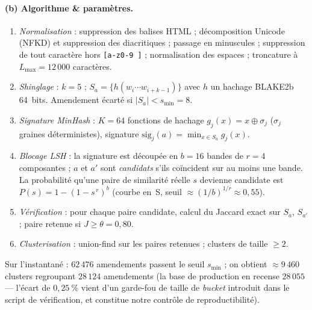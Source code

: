 \documentclass[11pt,a4paper]{article}
\begin{document}
\paragraph{(b) Algorithme \& paramètres.}
\begin{enumerate}[label=\arabic*.]
  \item \emph{Normalisation} : suppression des balises HTML ; décomposition
        Unicode (NFKD) et suppression des diacritiques ; passage en minuscules ;
        suppression de tout caractère hors \texttt{[a-z0-9 ]} ; normalisation des
        espaces ; troncature à $L_{\max}=12\,000$ caractères.
  \item \emph{Shinglage} : $k = 5$ ; $S_a=\{h(w_i\cdots w_{i+k-1})\}$ avec $h$ un
        hachage BLAKE2b 64~bits. Amendement écarté si $|S_a| < s_{\min}=8$.
  \item \emph{Signature MinHash} : $K=64$ fonctions de hachage
        $g_j(x)=x\oplus\sigma_j$ ($\sigma_j$ graines déterministes), signature
        $\mathrm{sig}_j(a)=\min_{x\in S_a} g_j(x)$.
  \item \emph{Blocage LSH} : la signature est découpée en $b=16$ bandes de $r=4$
        composantes ; $a$ et $a'$ sont \emph{candidats} s'ils coïncident sur au
        moins une bande. La probabilité qu'une paire de similarité réelle $s$
        devienne candidate est $P(s)=1-(1-s^{\,r})^{b}$ (courbe en~S, seuil
        $\approx (1/b)^{1/r}\approx 0{,}55$).
  \item \emph{Vérification} : pour chaque paire candidate, calcul du Jaccard exact
        sur $S_a$, $S_{a'}$ ; paire retenue si $J\ge\theta=0{,}80$.
  \item \emph{Clusterisation} : union-find sur les paires retenues ; clusters de
        taille $\ge 2$.
\end{enumerate}
Sur l'instantané : $62\,476$ amendements passent le seuil $s_{\min}$ ; on obtient
$\approx 9\,460$ clusters regroupant $28\,124$ amendements (la base de production en
recense $28\,055$ — l'écart de $0{,}25~\%$ vient d'un garde-fou de taille de
\emph{bucket} introduit dans le script de vérification, et constitue notre contrôle
de reproductibilité).
\end{document}
